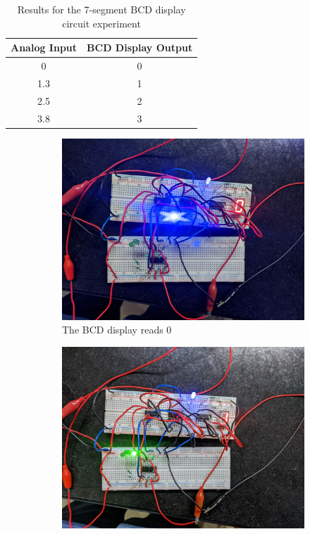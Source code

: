 \documentclass[%
 reprint,
nofootinbib,
 amsmath,amssymb,
 aps,
floatfix,
]{revtex4-2}
\begin{document}
    \begin{table}[]
    \caption{Results for the 7-segment BCD display circuit experiment}
    \label{tab:bcd}
    \setlength{\tabcolsep}{15pt}
    \begin{tabular}{@{}cc@{}}
    \toprule
    \textbf{Analog Input} & \textbf{BCD Display Output} \\ \midrule
    0 & 0 \\
    1.3 & 1 \\
    2.5 & 2 \\
    3.8 & 3 \\ \bottomrule
    \end{tabular}
    \end{table}
    \begin{figure}
        \centering
        \begin{subfigure}[b]{0.3\textwidth}
            \centering
            \includegraphics[width=\textwidth]{Figures/5.jpg}
            \caption{The BCD display reads 0}
            \label{fig:y equals x}
        \end{subfigure}
        \hfill
        \begin{subfigure}[b]{0.3\textwidth}
            \centering
            \includegraphics[width=\textwidth]{Figures/6.jpg}

\end{subfigure}
\end{figure}
\end{document}
